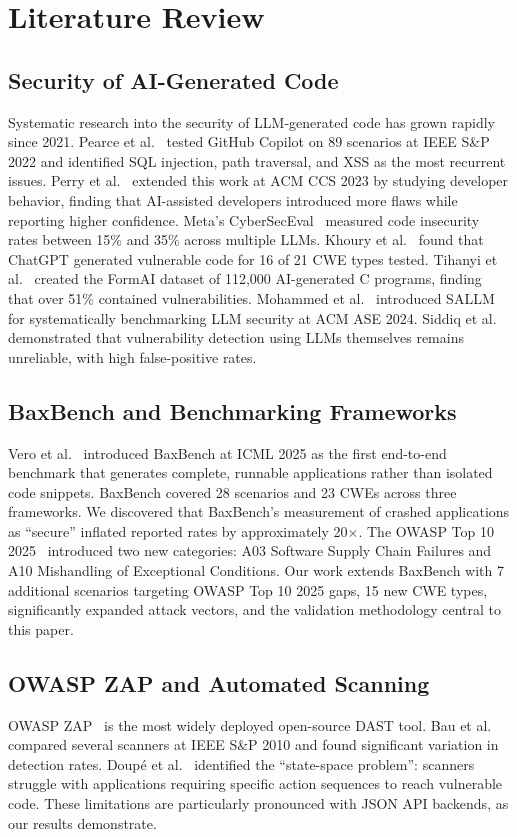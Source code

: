 \documentclass[conference,a4paper]{IEEEtran}
\begin{document}
\section{Literature Review}

\subsection{Security of AI-Generated Code}
Systematic research into the security of LLM-generated code has grown rapidly since 2021. Pearce et al.~\cite{pearce2022} tested GitHub Copilot on 89 scenarios at IEEE S\&P 2022 and identified SQL injection, path traversal, and XSS as the most recurrent issues. Perry et al.~\cite{perry2023} extended this work at ACM CCS 2023 by studying developer behavior, finding that AI-assisted developers introduced more flaws while reporting higher confidence. Meta's CyberSecEval~\cite{bhatt2023} measured code insecurity rates between 15\% and 35\% across multiple LLMs. Khoury et al.~\cite{khoury2023} found that ChatGPT generated vulnerable code for 16 of 21 CWE types tested. Tihanyi et al.~\cite{tihanyi2023} created the FormAI dataset of 112,000 AI-generated C programs, finding that over 51\% contained vulnerabilities. Mohammed et al.~\cite{mohammed2024} introduced SALLM for systematically benchmarking LLM security at ACM ASE 2024. Siddiq et al.~\cite{siddiq2024} demonstrated that vulnerability detection using LLMs themselves remains unreliable, with high false-positive rates.

\subsection{BaxBench and Benchmarking Frameworks}
Vero et al.~\cite{vero2025} introduced BaxBench at ICML 2025 as the first end-to-end benchmark that generates complete, runnable applications rather than isolated code snippets. BaxBench covered 28 scenarios and 23 CWEs across three frameworks. We discovered that BaxBench's measurement of crashed applications as ``secure'' inflated reported rates by approximately 20$\times$. The OWASP Top 10 2025~\cite{owasp2025} introduced two new categories: A03 Software Supply Chain Failures and A10 Mishandling of Exceptional Conditions. Our work extends BaxBench with 7 additional scenarios targeting OWASP Top 10 2025 gaps, 15 new CWE types, significantly expanded attack vectors, and the validation methodology central to this paper.

\subsection{OWASP ZAP and Automated Scanning}
OWASP ZAP~\cite{zap} is the most widely deployed open-source DAST tool. Bau et al.~\cite{bau2010} compared several scanners at IEEE S\&P 2010 and found significant variation in detection rates. Doup\'{e} et al.~\cite{doupe2010} identified the ``state-space problem'': scanners struggle with applications requiring specific action sequences to reach vulnerable code. These limitations are particularly pronounced with JSON API backends, as our results demonstrate.
\end{document}
